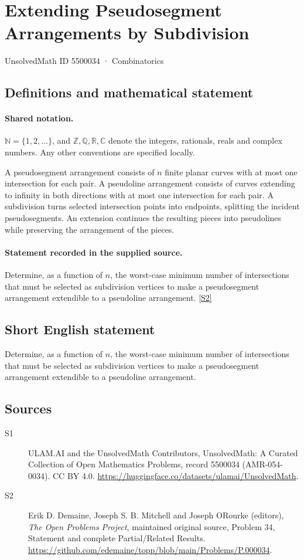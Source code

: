 \documentclass[11pt]{article}
\newcommand{\sref}[2]{\hyperlink{source:#1:#2}{[S#2]}}
\begin{document}
\setcounter{section}{5500033}
\section{Extending Pseudosegment Arrangements by Subdivision}\label{5500034}
{\small\sffamily UnsolvedMath ID 5500034 · Combinatorics}
\subsection{Definitions and mathematical statement}

\paragraph{Shared notation.}$\mathbb N=\{1,2,\ldots\}$, and $\mathbb Z,\mathbb Q,\mathbb R,\mathbb C$ denote the integers, rationals, reals and complex numbers. Any other conventions are specified locally.


A pseudosegment arrangement consists of $n$ finite planar curves with at most one intersection for each pair. A pseudoline arrangement consists of curves extending to infinity in both directions with at most one intersection for each pair. A subdivision turns selected intersection points into endpoints, splitting the incident pseudosegments. An extension continues the resulting pieces into pseudolines while preserving the arrangement of the pieces.
\paragraph{Statement recorded in the supplied source.}
Determine, as a function of $n$, the worst-case minimum number of intersections that must be selected as subdivision vertices to make a pseudosegment arrangement extendible to a pseudoline arrangement. \sref{5500034}{2}
\subsection{Short English statement}
Determine, as a function of $n$, the worst-case minimum number of intersections that must be selected as subdivision vertices to make a pseudosegment arrangement extendible to a pseudoline arrangement.
\subsection{Sources}
\begin{description}
\item[\hypertarget{source:5500034:1}{S1}] ULAM.AI and the UnsolvedMath Contributors, UnsolvedMath: A Curated Collection of Open Mathematics Problems, record 5500034 (AMR-054-0034). CC BY 4.0. \url{https://huggingface.co/datasets/ulamai/UnsolvedMath}.
\item[\hypertarget{source:5500034:2}{S2}] Erik D. Demaine, Joseph S. B. Mitchell and Joseph O\textquotesingle Rourke (editors), \emph{The Open Problems Project}, maintained original source, Problem 34, Statement and complete Partial/Related Results. \url{https://github.com/edemaine/topp/blob/main/Problems/P.000034}.
\end{description}
\label{end:5500034}
\end{document}
